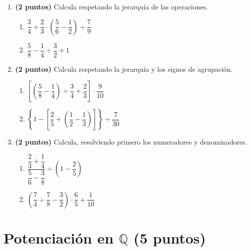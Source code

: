 \documentclass[12pt, letterpaper]{article}
\newcommand{\Q}{\mathbb{Q}}
\begin{document}
\begin{enumerate}[leftmargin=*, resume]

  \item \textbf{(2 puntos)} Calcula respetando la jerarquía de las operaciones.
        \begin{enumerate}[label=\alph*), leftmargin=*]
          \item $\dfrac{3}{4} + \dfrac{2}{3} \cdot \left(\dfrac{5}{6} - \dfrac{1}{2}\right) \div \dfrac{7}{9}$
          \item $\dfrac{5}{8} - \dfrac{1}{4} \div \dfrac{3}{2} + 1$
        \end{enumerate}

  \item \textbf{(2 puntos)} Calcula respetando la jerarquía y los signos de agrupación.
        \begin{enumerate}[label=\alph*), leftmargin=*]
          \item $\left[\left(\dfrac{5}{8} - \dfrac{1}{4}\right) \div \dfrac{3}{4} + \dfrac{2}{3}\right] \cdot \dfrac{9}{10}$
          \item $\left\{1 - \left[\dfrac{2}{5} + \left(\dfrac{1}{2} - \dfrac{1}{3}\right)\right]\right\} \div \dfrac{7}{30}$
        \end{enumerate}

  \item \textbf{(2 puntos)} Calcula, resolviendo primero los numeradores y denominadores.
        \begin{enumerate}[label=\alph*), leftmargin=*]
          \item $\dfrac{\dfrac{2}{3} + \dfrac{1}{4}}{\dfrac{5}{6} - \dfrac{3}{8}} \div \left(1 - \dfrac{2}{5}\right)$
          \item $\left(\dfrac{7}{4} \div \dfrac{7}{8} - \dfrac{3}{2}\right) \cdot \dfrac{6}{5} + \dfrac{1}{10}$
        \end{enumerate}

\end{enumerate}

\newpage

\section{Potenciación en $\Q$ (5 puntos)}
\end{document}
